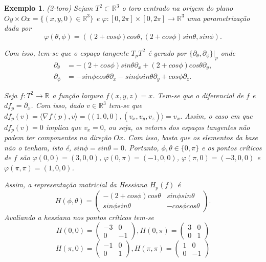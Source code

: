 \documentclass[12pt]{book}
\newtheorem{exemplo}[teorema]{Exemplo}
\newcommand{\derivadaparcialabrev}[1]{\partial_{#1}}
\newcommand{\produtointerno}[2]{\langle #1, #2 \rangle}
\newcommand{\real}[1]{\mathbb{R}^{#1}}
\newcommand{\reta}{\real{}}
\begin{document}
	\begin{exemplo}
		(2-toro) Sejam $T^{2} \subset \real{3}$ o toro centrado na origem do plano $Oy\times Ox = \{(x, y ,0) \in \real{3}\}$ e $\varphi:[0,2\pi]\times [0,2\pi] \to \real{3}$ uma parametrização dada por 
		$$
		\varphi(\theta, \phi) = ((2+cos\phi)cos\theta, (2+cos\phi)sin\theta, sin\phi).
		$$
		
		Com isso, tem-se que o espaço tangente $T_{p}T^{2} $ é gerado por $ \{\derivadaparcialabrev{\theta}, \derivadaparcialabrev{\phi} \}|_{p}$ onde
		$$
		\begin{aligned}
			\derivadaparcialabrev{\theta} &= -(2+cos\phi)sin\theta \derivadaparcialabrev{x}+(2+cos\phi)cos\theta \derivadaparcialabrev{y},
			\\
			\derivadaparcialabrev{\phi} &=  - sin\phi cos\theta 	\derivadaparcialabrev{x} - sin\phi sin\theta 	\derivadaparcialabrev{y} +cos\phi				\derivadaparcialabrev{z}.
			\end{aligned} 
		$$
				
		Seja $f:T^{2} \to \reta$ a função largura $f(x,y,z)=x$. Tem-se que o diferencial de $f$ e $df_{p} = \derivadaparcialabrev{x}$. Com isso, dado $v \in \real{3}$ tem-se que $df_{p}(v) = \produtointerno{\nabla f(p)}{v}  = \produtointerno{(1,0,0)}{(v_{x}, v_{y}, v_{z})} =v_{x}$. Assim, o caso em que $df_{p}(v) = 0$ implica que $v_{x} = 0$, ou seja, os vetores dos espaços tangentes não podem ter componentes na direção $Ox$. Com isso, basta que os elementos da base não o tenham, isto é, $sin\phi = sin\theta = 0$. Portanto, $\phi, \theta \in \{0, \pi\}$ e os pontos críticos de $f$ são $\varphi(0,0) = (3,0,0)$, $\varphi(0,\pi) = (-1,0,0)$, $\varphi(\pi,0) = (-3,0,0)$ e $\varphi(\pi,\pi) = (1,0,0)$.
			
		Assim, a representação matricial da Hessiana $H_{p}(f)$ é
			$$
			H(\phi, \theta) = 
			\left(
			\begin{array}{cc}
			-(2+cos\phi)cos\theta & sin\phi sin\theta  
			\\
			sin\phi sin\theta   & -cos\phi cos\theta  
			\end{array}
			\right).
			$$
		Avaliando a hessiana nos pontos críticos tem-se
			$$
			H(0, 0) = 
			\left(
			\begin{array}{cc}
			-3 & 0
			\\
			0& -1
			\end{array}
			\right),
			H(0, \pi) = 
			\left(
			\begin{array}{cc}
			3 & 0
			\\
			0& 1
			\end{array}
			\right)
			$$
			$$
			H(\pi, 0) = 
			\left(
			\begin{array}{cc}
			-1 & 0
			\\
			0& 1
			\end{array}
			\right),
			H(\pi, \pi) = 
			\left(
			\begin{array}{cc}
			1 & 0
			\\
			0& -1
			\end{array}
			\right)
			$$
			

\end{exemplo}
\end{document}

